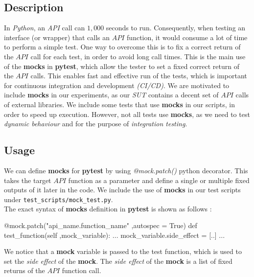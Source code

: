 \subsection{Description} 
In \emph{Python}, an \emph{API} call can $1,000$ seconds to run. Consequently, when testing an interface (or wrapper) that calls an $API$ function, it would consume a lot of time to perform a simple test. One way to overcome this is to fix a correct return of the $API$ call for each test, in order to avoid long call times. This is the main use of the \textbf{mocks} in \textbf{pytest}, which allow the tester to set a fixed correct return of the $API$ calls. This enables fast and effective run of the tests, which is important for continuous integration and development \emph{(CI/CD)}. We are motivated to include \textbf{mocks} in our experiments, as our \emph{SUT} contains a decent set of $API$ calls of external libraries. We include some tests that use \textbf{mocks} in our scripts, in order to speed up execution. However, not all tests use \textbf{mocks}, as we need to test \emph{dynamic behaviour} and for the purpose of \emph{integration testing}.

\subsection{Usage}
We can define \textbf{mocks} for \textbf{pytest} by using \emph{@mock.patch()} python decorator. This takes the target $API$ function as a parameter and define a single or multiple fixed outputs of it later in the code. We include the use of \textbf{mocks} in our test scripts under \texttt{test\_scripts/mock\_test.py}. \\

The exact syntax of \textbf{mocks} definition in \textbf{pytest} is shown as follows :
\begin{python}
@mock.patch("api_name.function_name" ,autospec = True)
    def test_function(self ,mock_variable):
    ...
    mock_variable.side_effect = [..]
    ...
\end{python}
We notice that a \textbf{mock} variable is passed to the test function, which is used to set the \emph{side effect} of the \textbf{mock}. The \emph{side effect} of the \textbf{mock} is a list of fixed returns of the $API$ function call.

